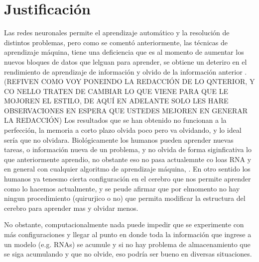 \section{Justificaci\'on}

    Las redes neuronales permite el aprendizaje automático y la resoluci\'on 
    de distintos problemas,  pero como se comentó anteriormente,  las técnicas 
    de aprendizaje máquina, tiene una deficiencia que es al momento de aumentar 
    los nuevos bloques de datos que lelguan para aprender,  se obtiene un deteriro 
    en el rendimiento de aprendizaje de información y olvido de la información anterior
    \cite{bullinaria2009}.   (REFIVEN COMO VOY PONEINDO LA REDACCIÓN DE LO QNTERIOR, Y 
    CO NELLO TRATEN DE CAMBIAR LO QUE VIENE PARA QUE LE MOJOREN EL ESTILO, DE AQUÍ EN 
    ADELANTE SOLO LES HARE OBSERVACIONES EN ESPERA QUE USTEDES MEJOREN EN GENERAR LA 
    REDACCIÓN) Los resultados que se han obtenido no funcionan a la perfección, la 
    memoria a corto plazo olvida poco pero va olvidando, y lo ideal sería que no 
    olvidara. Biológicamente los humanos pueden aprender nuevas tareas, o información 
    nueva de un problema, y no olvida de forma siginficativa lo que anteriormente 
    aprendio, no obstante eso no pasa actualemnte co loas RNA y en general con 
    cualquier algoritmo de aprendizaje máquina, . En otro sentido los humanos 
    ya tenesmo cierta configuración en el cerebro que nos permite aprender como 
    lo hacemos actualmente,  y se peude afirmar que por elmomento no hay ningun 
    procedimiento (quirurjico o no) que permita modificar la estructura del cerebro 
    para aprender mas y olvidar menos. 

    No obstante,  computacionalmente nada puede impedir que se experimente con más 
    configuraciones y llegar al punto en donde toda la información que ingrese a un 
    modelo (e.g. RNAs) se acumule y si no hay problema de almacenamiento que se siga 
    acumulando y que no olvide, eso podría ser bueno en diversas situaciones.

